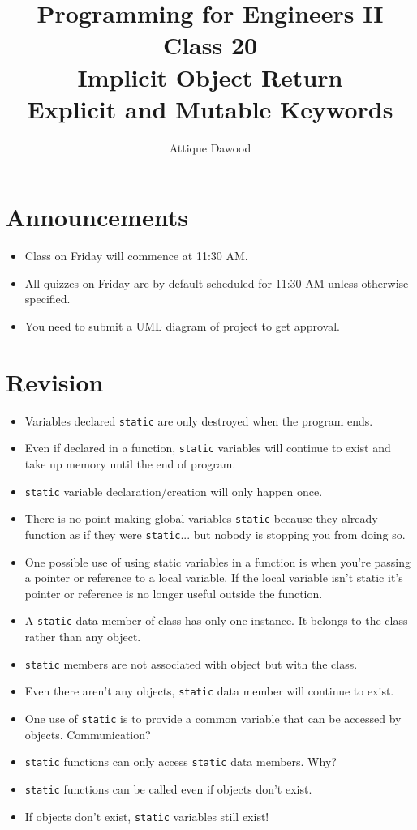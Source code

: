 \documentclass[12pt,a4paper]{article}
\title{\vspace{-2cm}Programming for Engineers II\\Class 20\\Implicit Object Return\\Explicit and Mutable Keywords}
\author{Attique Dawood}
\begin{document}
\maketitle
\section{Announcements}
\begin{itemize}
\item Class on Friday will commence at 11:30 AM.
\item All quizzes on Friday are by default scheduled for 11:30 AM unless otherwise specified.
\item You need to submit a UML diagram of project to get approval.
\end{itemize}
\section{Revision}
\begin{itemize}
\item Variables declared \verb|static| are only destroyed when the program ends.
\item Even if declared in a function, \verb|static| variables will continue to exist and take up memory until the end of program.
\item \verb|static| variable declaration/creation will only happen once.
\item There is no point making global variables \verb|static| because they already function as if they were \verb|static|... but nobody is stopping you from doing so.
\item One possible use of using static variables in a function is when you're passing a pointer or reference to a local variable. If the local variable isn't static it's pointer or reference is no longer useful outside the function.
\item A \verb|static| data member of class has only one instance. It belongs to the class rather than any object.
\item \verb|static| members are not associated with object but with the class.
\item Even there aren't any objects, \verb|static| data member will continue to exist.
\item One use of \verb|static| is to provide a common variable that can be accessed by objects. Communication?
\item \verb|static| functions can only access \verb|static| data members. Why?
\item \verb|static| functions can be called even if objects don't exist.
\item If objects don't exist, \verb|static| variables still exist!
\end{itemize}
\end{document}
